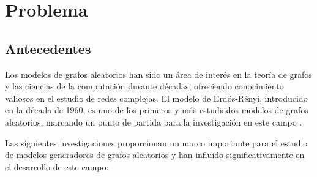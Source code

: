 \section{Problema}
\subsection{Antecedentes}
Los modelos de grafos aleatorios han sido un área de interés en la teoría de grafos y las ciencias de la 
computación durante décadas, ofreciendo conocimiento valiosos en el estudio de redes complejas. El modelo
 de Erdős-Rényi, introducido en la década de 1960, es uno de los primeros y más estudiados modelos de grafos aleatorios, marcando un punto de partida para la investigación en este campo \citep{Erdos1959}.

Las siguientes investigaciones proporcionan un marco importante para el estudio de modelos generadores de grafos aleatorios y han influido significativamente en el desarrollo de este campo:

